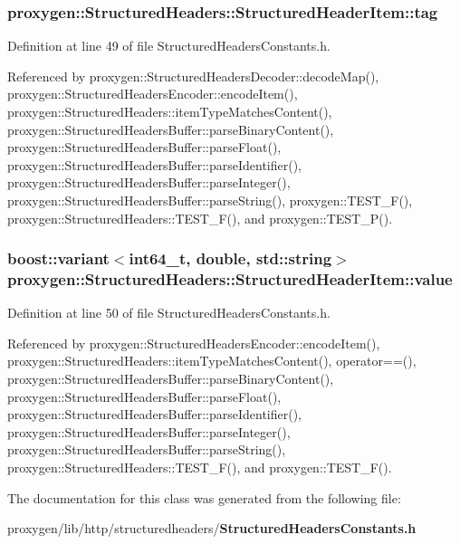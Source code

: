 \subsubsection[{tag}]{ proxygen\+::\+Structured\+Headers\+::\+Structured\+Header\+Item\+::tag}\label{classproxygen_1_1StructuredHeaders_1_1StructuredHeaderItem_abcc65cfdb4bd74bf9d9abd74c8d02c13}


Definition at line 49 of file Structured\+Headers\+Constants.\+h.



Referenced by proxygen\+::\+Structured\+Headers\+Decoder\+::decode\+Map(), proxygen\+::\+Structured\+Headers\+Encoder\+::encode\+Item(), proxygen\+::\+Structured\+Headers\+::item\+Type\+Matches\+Content(), proxygen\+::\+Structured\+Headers\+Buffer\+::parse\+Binary\+Content(), proxygen\+::\+Structured\+Headers\+Buffer\+::parse\+Float(), proxygen\+::\+Structured\+Headers\+Buffer\+::parse\+Identifier(), proxygen\+::\+Structured\+Headers\+Buffer\+::parse\+Integer(), proxygen\+::\+Structured\+Headers\+Buffer\+::parse\+String(), proxygen\+::\+T\+E\+S\+T\+\_\+\+F(), proxygen\+::\+Structured\+Headers\+::\+T\+E\+S\+T\+\_\+\+F(), and proxygen\+::\+T\+E\+S\+T\+\_\+\+P().

\subsubsection[{value}]{\setlength{\rightskip}{0pt plus 5cm}boost\+::variant$<$int64\+\_\+t, double, std\+::string$>$ proxygen\+::\+Structured\+Headers\+::\+Structured\+Header\+Item\+::value}\label{classproxygen_1_1StructuredHeaders_1_1StructuredHeaderItem_a1e21d3855c8356151ef0277bd7b32a46}


Definition at line 50 of file Structured\+Headers\+Constants.\+h.



Referenced by proxygen\+::\+Structured\+Headers\+Encoder\+::encode\+Item(), proxygen\+::\+Structured\+Headers\+::item\+Type\+Matches\+Content(), operator==(), proxygen\+::\+Structured\+Headers\+Buffer\+::parse\+Binary\+Content(), proxygen\+::\+Structured\+Headers\+Buffer\+::parse\+Float(), proxygen\+::\+Structured\+Headers\+Buffer\+::parse\+Identifier(), proxygen\+::\+Structured\+Headers\+Buffer\+::parse\+Integer(), proxygen\+::\+Structured\+Headers\+Buffer\+::parse\+String(), proxygen\+::\+Structured\+Headers\+::\+T\+E\+S\+T\+\_\+\+F(), and proxygen\+::\+T\+E\+S\+T\+\_\+\+F().



The documentation for this class was generated from the following file\+:\begin{DoxyCompactItemize}
\item 
proxygen/lib/http/structuredheaders/{\bf Structured\+Headers\+Constants.\+h}\end{DoxyCompactItemize}
